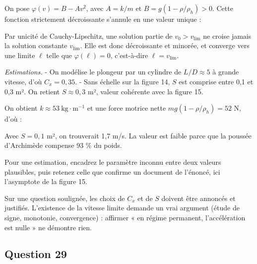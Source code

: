 \documentclass[11pt,a4paper]{article}
\newcommand{\equationajustee}[1]{%
  \sbox{\boiteequation}{$\displaystyle #1$}%
  \ifdim\wd\boiteequation>\linewidth
    \[\resizebox{\linewidth}{!}{\usebox{\boiteequation}}\]%
  \else
    \[#1\]%
  \fi}
\begin{document}
On pose \(\varphi(v) = B - Av^2\), avec \(A = k/m\) et \(B = g(1 - \rho/\rho_h) > 0\). Cette fonction strictement décroissante s'annule en une valeur unique :

\equationajustee{\boxed{v_{\text{lim}} = \sqrt{\frac{mg}{k}\left(1 - \frac{\rho}{\rho_h}\right)} = \sqrt{\frac{2mg(\rho_h - \rho)}{\rho_h\,\rho\,C_x S}}}}

Par unicité de Cauchy-Lipschitz, une solution partie de \(v_0 > v_{\text{lim}}\) ne croise jamais la solution constante \(v_{\text{lim}}\). Elle est donc décroissante et minorée, et converge vers une limite \(\ell\) telle que \(\varphi(\ell) = 0\), c'est-à-dire \(\ell = v_{\text{lim}}\).

\emph{Estimations.}
- On modélise le plongeur par un cylindre de \(L/D \approx 5\) à grande vitesse, d'où \(C_x = 0{,}35\).
- Sans échelle sur la figure 14, \(S\) est comprise entre 0,1 et 0,3 m². On retient \(S \approx 0{,}3\) m², valeur cohérente avec la figure 15.

On obtient \(k \approx 53\ \mathrm{kg\cdot m^{-1}}\) et une force motrice nette \(mg(1 - \rho/\rho_h) = 52\) N, d'où :

\equationajustee{\boxed{v_{\text{lim}} \approx 1{,}0\ \mathrm{m\cdot s^{-1}}}}

Avec \(S = 0{,}1\) m², on trouverait 1,7 m/s. La valeur est faible parce que la poussée d'Archimède compense 93 \% du poids.

\begin{methode}

Pour une estimation, encadrez le paramètre inconnu entre deux valeurs plausibles, puis retenez celle que confirme un document de l'énoncé, ici l'asymptote de la figure 15.

\end{methode}

\begin{jury}

Sur une question soulignée, les choix de \(C_x\) et de \(S\) doivent être annoncés et justifiés. L'existence de la vitesse limite demande un vrai argument (étude de signe, monotonie, convergence) : affirmer « en régime permanent, l'accélération est nulle » ne démontre rien.

\end{jury}

\hypertarget{question-29}{%
\subsection{Question 29}\label{question-29}}
\end{document}
